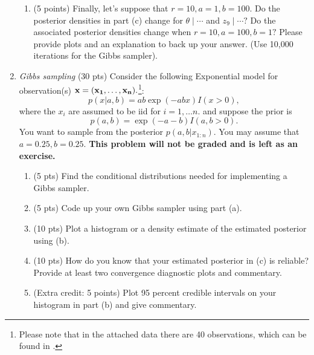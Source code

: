 \documentclass{article}
\begin{document}
\begin{enumerate}
\begin{enumerate}
\item (5 points) Finally, let's suppose that $r=10,a=1,b=100.$ Do the posterior densities in part (c) change for $\theta \mid \cdots$ and $z_9 \mid \cdots?$
 Do the associated posterior densities change when $r=10, a=100,b=1?$ Please provide plots and an explanation to back up your answer.  (Use 10,000 iterations for the Gibbs sampler). 
\end{enumerate}
\item \emph{Gibbs sampling} (30 pts) Consider the following Exponential model for observation(s) $\bf{x}=(x_1,\ldots,x_n).$\footnote{Please note that in the attached data there are 40 observations, which can be found in .}:
$$ p(x|a,b) = a b \exp(- a b x) I(x>0),$$ where the $x_i$ are assumed to be iid for $i=1,\ldots n.$
and suppose the prior is 
$$ p(a,b) = \exp(- a - b)I(a,b>0). $$
You want to sample from the posterior $p(a,b|x_{1:n})$.  You may assume that $a=0.25, b=0.25.$  \textbf{This problem will not be graded and is left as an exercise.}
\begin{enumerate}
\item (5 pts) Find the conditional distributions needed for implementing a Gibbs sampler. 
\item (5 pts) Code up your own Gibbs sampler using part (a). 
\item (10 pts) Plot a histogram or a density estimate of the estimated posterior using (b). 
\item (10 pts) How do you know that your estimated posterior in (c) is reliable? Provide at least two convergence diagnostic plots and commentary. 
\item (Extra credit: 5 points) Plot 95 percent credible intervals on your histogram in part (b) and give commentary. 
\end{enumerate}



\end{enumerate}
\end{document}
